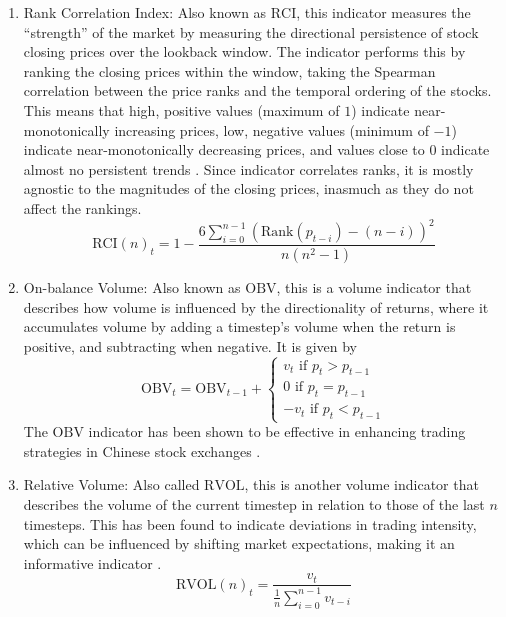 \documentclass[stu,floatsintext]{apa7}
\begin{document}
\begin{enumerate}
\begin{equation}\text{PL}(n)_t=\frac{\text{\# of upticks}}{n}\end{equation}
\item Rank Correlation Index: Also known as $\text{RCI}$, this indicator measures the ``strength'' of the market by measuring the directional persistence of stock closing prices over the lookback window. The indicator performs this by ranking the closing prices within the window, taking the Spearman correlation between the price ranks and the temporal ordering of the stocks. This means that high, positive values (maximum of $1$) indicate near-monotonically increasing prices, low, negative values (minimum of $-1$) indicate near-monotonically decreasing prices, and values close to $0$ indicate almost no persistent trends \parencite{tanakayamawaki2007adaptive}. Since indicator correlates ranks, it is mostly agnostic to the magnitudes of the closing prices, inasmuch as they do not affect the rankings.
\begin{equation}\text{RCI}(n)_t=1-\frac{6\displaystyle\sum_{i=0}^{n-1}(\text{Rank}(p_{t-i})-(n-i))^2}{n(n^2-1)}\end{equation}
\item On-balance Volume: Also known as $\text{OBV}$, this is a volume indicator that describes how volume is influenced by the directionality of returns, where it accumulates volume by adding a timestep's volume when the return is positive, and subtracting when negative. It is given by
\begin{equation}\text{OBV}_t=\text{OBV}_{t-1}+\begin{cases}
v_t\text{ if }p_t>p_{t-1}\\
0\text{ if }p_t=p_{t-1}\\
-v_t\text{ if }p_t<p_{t-1}
\end{cases}\end{equation}
The $\text{OBV}$ indicator has been shown to be effective in enhancing trading strategies in Chinese stock exchanges \parencite{tsang2009obv}.
\item Relative Volume: Also called $\text{RVOL}$, this is another volume indicator that describes the volume of the current timestep in relation to those of the last $n$ timesteps. This has been found to indicate deviations in trading intensity, which can be influenced by shifting market expectations, making it an informative indicator \parencite{karpoff1987rvol}.
\begin{equation}\text{RVOL}(n)_t=\frac{v_t}{\displaystyle\frac{1}{n}\sum_{i=0}^{n-1}v_{t-i}}\end{equation}

\end{enumerate}
\end{document}
